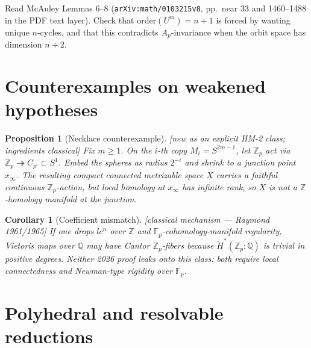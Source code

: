 \documentclass[11pt]{article}
\newtheorem{proposition}[theorem]{Proposition}
\newtheorem{corollary}[theorem]{Corollary}
\theoremstyle{definition}
\newcommand{\status}[1]{\textit{\textcolor{black!70}{[#1]}}}
\begin{document}
\begin{checkboxenv}
Read McAuley Lemmas 6--8 (\texttt{arXiv:math/0103215v8}, pp.~near 33 and
1460--1488 in the PDF text layer).  Check that order$(U^m)=n+1$ is forced by
wanting unique $n$-cycles, and that this contradicts $A_p$-invariance when the
orbit space has dimension $n+2$.
\end{checkboxenv}

\section{Counterexamples on weakened hypotheses}
\label{sec:counterex}

\begin{proposition}[Necklace counterexample]
\label{prop:necklace}
\status{new as an explicit HM-2 class; ingredients classical}
Fix $m\ge 1$.  On the $i$-th copy $M_i=S^{2m-1}$, let $\mathbb{Z}_p$ act via
$\mathbb{Z}_p\twoheadrightarrow C_{p^i}\subset S^1$.  Embed the spheres as
radius $2^{-i}$ and shrink to a junction point $x_\infty$.  The resulting
compact connected metrizable space $X$ carries a faithful continuous
$\mathbb{Z}_p$-action, but local homology at $x_\infty$ has infinite rank, so
$X$ is not a $\mathbb{Z}$-homology manifold at the junction.
\end{proposition}

\begin{corollary}[Coefficient mismatch]
\label{cor:hm1}
\status{classical mechanism --- Raymond 1961/1965}
If one drops $lc^n$ over $\mathbb{Z}$ and $\mathbb{F}_p$-cohomology-manifold
regularity, Vietoris maps over $\mathbb{Q}$ may have Cantor $\mathbb{Z}_p$-fibers
because $\check{H}^*(\mathbb{Z}_p;\mathbb{Q})$ is trivial in positive degrees.
Neither 2026 proof leaks onto this class: both require local connectedness and
Newman-type rigidity over $\mathbb{F}_p$.
\end{corollary}

\section{Polyhedral and resolvable reductions}
\label{sec:reductions}
\end{document}
